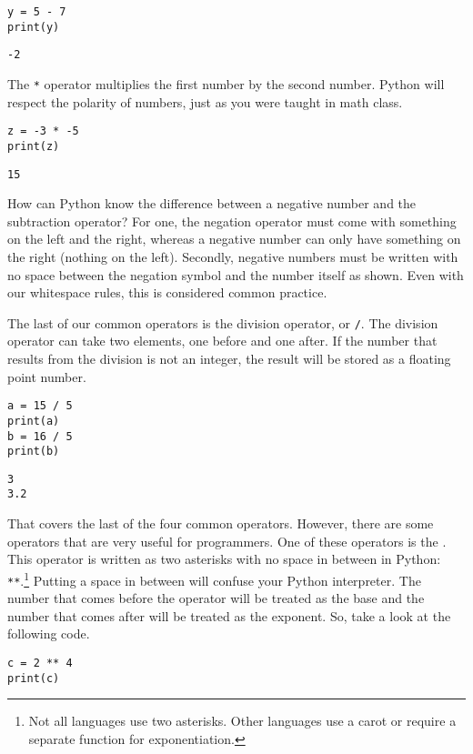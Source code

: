 \begin{lstlisting}[style=pippython]
y = 5 - 7
print(y)
\end{lstlisting}
\begin{lstlisting}[style=none]
-2
\end{lstlisting}
The \verb|*| operator multiplies the first number by the second number. Python will respect the polarity of numbers, just as you were taught in math class.\par
\begin{lstlisting}[style=pippython]
z = -3 * -5
print(z)
\end{lstlisting}
\begin{lstlisting}[style=none]
15
\end{lstlisting}
How can Python know the difference between a negative number and the subtraction operator? For one, the negation operator must come with something on the left and the right, whereas a negative number can only have something on the right (nothing on the left). Secondly, negative numbers must be written with no space between the negation symbol and the number itself as shown. Even with our whitespace rules, this is considered common practice.\par
The last of our common operators is the division operator, or \verb|/|. The division operator can take two elements, one before and one after. If the number that results from the division is not an integer, the result will be stored as a floating point number.\par
\begin{lstlisting}[style=pippython]
a = 15 / 5
print(a)
b = 16 / 5
print(b)
\end{lstlisting}
\begin{lstlisting}[style=none]
3
3.2
\end{lstlisting}
That covers the last of the four common operators. However, there are some operators that are very useful for programmers. One of these operators is the . This operator is written as two asterisks with no space in between in Python: \verb|**|.\footnote{Not all languages use two asterisks. Other languages use a carot or require a separate function for exponentiation.} Putting a space in between will confuse your Python interpreter. The number that comes before the operator will be treated as the base and the number that comes after will be treated as the exponent. So, take a look at the following code.\par
\begin{lstlisting}[style=pippython]
c = 2 ** 4
print(c)
\end{lstlisting}
